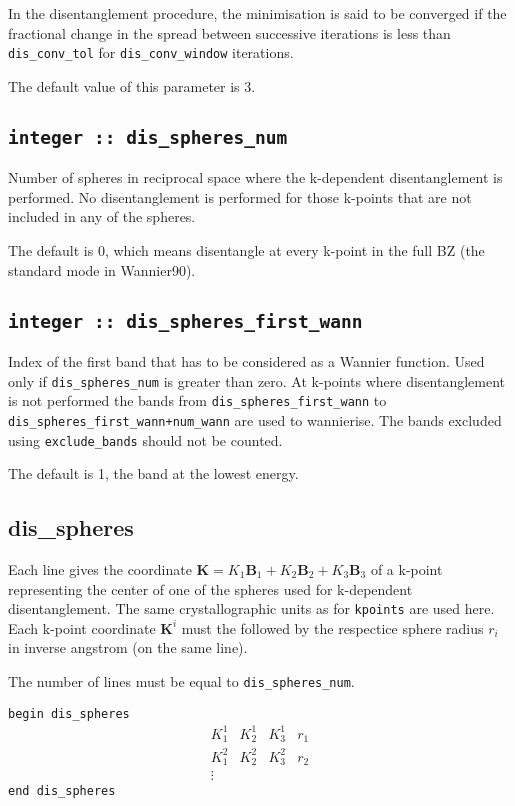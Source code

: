 In the disentanglement procedure, the minimisation is said to be converged
if the fractional change in the spread between successive
iterations is less than
\verb#dis_conv_tol# for \verb#dis_conv_window# iterations.

The default value of this parameter is 3.

\subsection[dis\_spheres\_num]{\tt integer :: dis\_spheres\_num}
Number of spheres in reciprocal space where the k-dependent
disentanglement is performed. No disentanglement is performed for
those k-points that are not included in any of the spheres.

The default is 0, which means disentangle at every k-point in the full BZ (the standard mode in Wannier90).


\subsection[dis\_spheres\_first\_wann]{\tt integer :: dis\_spheres\_first\_wann}
Index of the first band that has to be considered as a Wannier function. Used only if {\tt dis\_spheres\_num} is greater than zero.
At k-points where disentanglement is not performed the bands from
{\tt dis\_spheres\_first\_wann} to {\tt dis\_spheres\_first\_wann+num\_wann} are used
to wannierise. The bands excluded using {\tt exclude\_bands} should not
be counted.

The default is 1, the band at the lowest energy.


\subsection[dis\_spheres]{dis\_spheres}
Each line gives the coordinate $\mathbf{K}=K_1 \mathbf{B}_{1} + K_2
\mathbf{B}_{2} + K_3 \mathbf{B}_3$ of a k-point representing the
center of one of the spheres used for k-dependent disentanglement.
The same crystallographic units as for {\tt kpoints} are used here.
Each k-point coordinate $\mathbf{K}^i$ must the followed by the
respectice sphere radius $r_{i}$ in inverse angstrom (on the same line).

The number of lines must be equal to {\tt dis\_spheres\_num}.

\noindent  \verb#begin dis_spheres#
$$
\begin{array}{cccc}
 K^{1}_{1} & K^{1}_{2} & K^{1}_{3} & r_{1} \\
 K^{2}_{1} & K^{2}_{2} & K^{2}_{3} & r_{2} \\
\vdots
\end{array}
$$
\verb#end dis_spheres#

